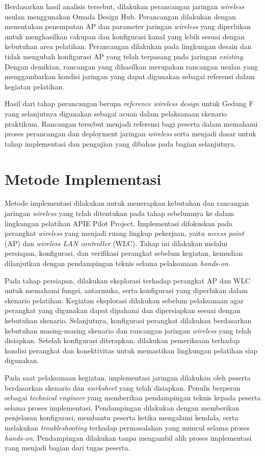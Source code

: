 Berdasarkan hasil analisis tersebut, dilakukan perancangan jaringan \textit{wireless} 
usulan menggunakan Omada Design Hub. Perancangan dilakukan dengan menentukan penempatan 
AP dan parameter jaringan \textit{wireless} yang diperlukan untuk menghasilkan cakupan 
dan konfigurasi kanal yang lebih sesuai dengan kebutuhan area pelatihan. Perancangan 
dilakukan pada lingkungan desain dan tidak mengubah konfigurasi AP yang telah terpasang 
pada jaringan \textit{existing}. Dengan demikian, rancangan yang dihasilkan merupakan 
rancangan usulan yang menggambarkan kondisi jaringan yang dapat digunakan sebagai 
referensi dalam kegiatan pelatihan.

Hasil dari tahap perancangan berupa \textit{reference wireless design} untuk Gedung F 
yang selanjutnya digunakan sebagai acuan dalam pelaksanaan skenario praktikum. 
Rancangan tersebut menjadi referensi bagi peserta dalam memahami proses perancangan 
dan deployment jaringan \textit{wireless} serta menjadi dasar untuk tahap implementasi 
dan pengujian yang dibahas pada bagian selanjutnya.

\section{Metode Implementasi}

Metode implementasi dilakukan untuk menerapkan kebutuhan dan rancangan jaringan
\textit{wireless} yang telah ditentukan pada tahap sebelumnya ke dalam lingkungan
pelatihan APIE Pilot Project. Implementasi difokuskan pada perangkat \textit{wireless}
yang menjadi ruang lingkup pekerjaan, yaitu \textit{access point} (AP) dan
\textit{wireless LAN controller} (WLC). Tahap ini dilakukan melalui persiapan,
konfigurasi, dan verifikasi perangkat sebelum kegiatan, kemudian dilanjutkan dengan
pendampingan teknis selama pelaksanaan \textit{hands-on}.

Pada tahap persiapan, dilakukan eksplorasi terhadap perangkat AP dan WLC untuk
memahami fungsi, antarmuka, serta konfigurasi yang diperlukan dalam skenario
pelatihan. Kegiatan eksplorasi dilakukan sebelum pelaksanaan agar perangkat yang
digunakan dapat dipahami dan dipersiapkan sesuai dengan kebutuhan skenario. Selanjutnya,
konfigurasi perangkat dilakukan berdasarkan kebutuhan masing-masing skenario dan
rancangan jaringan \textit{wireless} yang telah disiapkan. Setelah konfigurasi
diterapkan, dilakukan pemeriksaan terhadap kondisi perangkat dan konektivitas untuk
memastikan lingkungan pelatihan siap digunakan.

Pada saat pelaksanaan kegiatan, implementasi jaringan dilakukan oleh peserta
berdasarkan skenario dan \textit{worksheet} yang telah disiapkan. Penulis berperan
sebagai \textit{technical engineer} yang memberikan pendampingan teknis kepada
peserta selama proses implementasi. Pendampingan dilakukan dengan memberikan
penjelasan konfigurasi, membantu peserta ketika mengalami kendala, serta melakukan
\textit{troubleshooting} terhadap permasalahan yang muncul selama proses
\textit{hands-on}. Pendampingan dilakukan tanpa mengambil alih proses implementasi
yang menjadi bagian dari tugas peserta.

